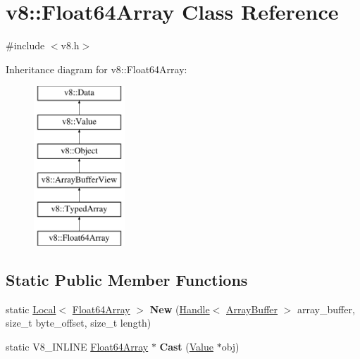 \hypertarget{classv8_1_1Float64Array}{}\section{v8\+:\+:Float64\+Array Class Reference}
\label{classv8_1_1Float64Array}


{\ttfamily \#include $<$v8.\+h$>$}

Inheritance diagram for v8\+:\+:Float64\+Array\+:\begin{figure}[H]
\begin{center}
\leavevmode
\includegraphics[height=6.000000cm]{classv8_1_1Float64Array}
\end{center}
\end{figure}
\subsection*{Static Public Member Functions}
\begin{DoxyCompactItemize}
\item 
\hypertarget{classv8_1_1Float64Array_ae09a38a945fb88065956e1d87132f0b4}{}static \hyperlink{classv8_1_1Local}{Local}$<$ \hyperlink{classv8_1_1Float64Array}{Float64\+Array} $>$ {\bfseries New} (\hyperlink{classv8_1_1Handle}{Handle}$<$ \hyperlink{classv8_1_1ArrayBuffer}{Array\+Buffer} $>$ array\+\_\+buffer, size\+\_\+t byte\+\_\+offset, size\+\_\+t length)\label{classv8_1_1Float64Array_ae09a38a945fb88065956e1d87132f0b4}

\item 
\hypertarget{classv8_1_1Float64Array_a936ee8e8cb2cb892cc5369e3ee6a7784}{}static V8\+\_\+\+I\+N\+L\+I\+N\+E \hyperlink{classv8_1_1Float64Array}{Float64\+Array} $\ast$ {\bfseries Cast} (\hyperlink{classv8_1_1Value}{Value} $\ast$obj)\label{classv8_1_1Float64Array_a936ee8e8cb2cb892cc5369e3ee6a7784}

\end{DoxyCompactItemize}
